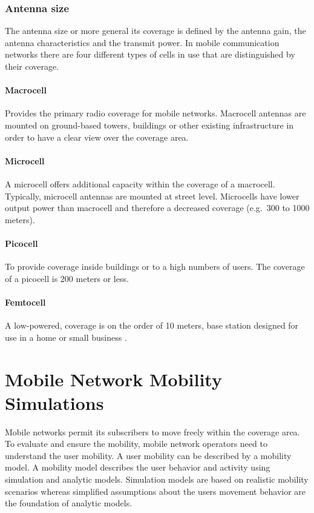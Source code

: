 \subsubsection{Antenna size}
The antenna size or more general its coverage is defined by the antenna gain, the antenna characteristics and the transmit power. In mobile communication networks there are four different types of cells in use that are distinguished by their coverage.
\paragraph{Macrocell} Provides the primary radio coverage for mobile networks. Macrocell antennas are mounted on ground-based towers, buildings or other existing infrastructure in order to have a clear view over the coverage area. 
\paragraph{Microcell} A microcell offers additional capacity within the coverage of a macrocell. Typically, microcell antennas are mounted at street level. Microcells have lower output power than macrocell and therefore a decreased coverage (e.g.\ 300 to 1000 meters).
\paragraph{Picocell} To provide coverage inside buildings or to a high numbers of users. The coverage of a picocell is 200 meters or less.
\paragraph{Femtocell} A low-powered, coverage is on the order of 10 meters, base station designed for use in a home or small business \cite{Zhang2011}.

\section{Mobile Network Mobility Simulations}
Mobile networks permit its subscribers to move freely within the coverage area. To evaluate and ensure the mobility, mobile network operators need to understand the user mobility. A user mobility can be described by a mobility model. A mobility model describes the user behavior and activity using simulation and analytic models. Simulation models are based on realistic mobility scenarios whereas simplified assumptions about the users movement behavior are the foundation of analytic models.

